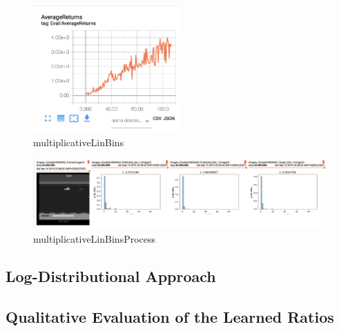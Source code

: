 \documentclass[12pt,a4paper,openright,twoside]{article}
\numberwithin{equation}{section}
\theoremstyle{definition}
\theoremstyle{remark}
\theoremstyle{plain}
\begin{document}
\begin{figure}[h]
    \centering
    \includegraphics[width=0.5\textwidth]{multiplicativeLinBins}
    \caption{multiplicativeLinBins}
    \label{fig:multiplicativeLinBins}
\end{figure}

\begin{figure}[h]
    \centering
    \includegraphics[width=\textwidth]{multiplicativeLinBinsProcess}
    \caption{multiplicativeLinBinsProcess}
    \label{fig:multiplicativeLinBinsProcess}
\end{figure}

\clearpage

\subsection*{Log-Distributional Approach}


\subsection*{Qualitative Evaluation of the Learned Ratios}
\end{document}

